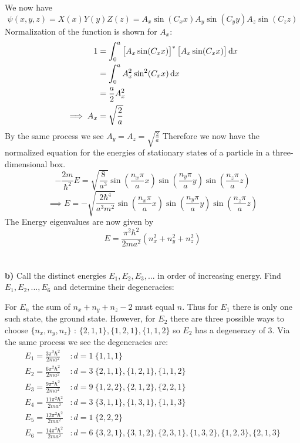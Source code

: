 \documentclass{scrartcl}
\begin{document}
We now have
\begin{displaymath}
\psi(x,y,z)=X(x)Y(y)Z(z)=A_x\sin(C_xx)A_y\sin(C_yy)A_z\sin(C_zz)
\end{displaymath}
Normalization of the function is shown for $A_x$:
\begin{align*}
1&=\int_{0}^{a}\left[A_x\sin(C_xx)\right]^*\left[A_x\sin(C_xx)\right]\dif{x}\\
&=\int_{0}^{a}A_x^2\sin^2(C_xx)\dif{x}\\
&=\frac{a}{2}A_x^2\\
\implies
 A_x&=\sqrt{\frac{2}{a}}
\end{align*}
By the same process we see $A_y=A_z=\sqrt{\frac{2}{a}}$
Therefore we now have the normalized equation for the energies of stationary states of a particle in a three-dimensional box.
\begin{displaymath}
-\frac{2m}{\hbar^2}E=\sqrt{\frac{8}{a^3}}\sin(\frac{n_x\pi}{a}x)\sin(\frac{n_y\pi}{a}y)\sin(\frac{n_z\pi}{a}z)
\end{displaymath}
\begin{displaymath}
  \implies E= -\sqrt{\frac{2\hbar^4}{a^3m^2}}\sin(\frac{n_x\pi}{a}x)\sin(\frac{n_y\pi}{a}y)\sin(\frac{n_z\pi}{a}z)
\end{displaymath}
The Energy eigenvalues are now given by
\begin{displaymath}
E = \frac{\pi^2\hbar^2}{2ma^2}(n_x^2+n_y^2+n_z^2)
\end{displaymath}\\\\

\textbf{b)} Call the distinct energies $E_1, E_2, E_3,...$ in order of increasing energy. Find $E_1,E_2,...,E_6$ and determine their degeneracies:

For $E_n$ the sum of $n_x+n_y+n_z-2$ must equal $n$. Thus for $E_1$ there is only one such state, the ground state. However, for $E_2$ there are three possible ways to choose $\{n_x,n_y,n_z\}$ : $\{2,1,1\}, \{1,2,1\}, \{1,1,2\}$ so $E_2$ has a degeneracy of 3. Via the same process we see the degeneracies are:
\begin{align*}
E_1 = \frac{3\pi^2\hbar^2}{2ma^2} &: d=1\ \{1,1,1\}\\
E_2 = \frac{6\pi^2\hbar^2}{2ma^2} &: d=3\ \{2,1,1\},\{1,2,1\},\{1,1,2\}\\
E_3 = \frac{9\pi^2\hbar^2}{2ma^2} &: d=9\ \{1,2,2\},\{2,1,2\},\{2,2,1\}\\
E_4 = \frac{11\pi^2\hbar^2}{2ma^2} &: d=3\ \{3,1,1\},\{1,3,1\},\{1,1,3\}\\
E_5 = \frac{12\pi^2\hbar^2}{2ma^2} &: d=1\ \{2,2,2\}\\
E_6 = \frac{14\pi^2\hbar^2}{2ma^2} &: d=6\ \{3,2,1\},\{3,1,2\},\{2,3,1\},\{1,3,2\},\{1,2,3\},\{2,1,3\}
\end{align*}\\\\
\end{document}
